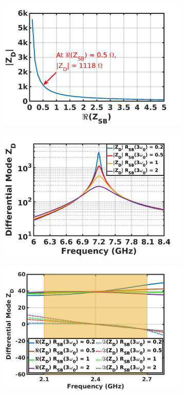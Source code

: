 \documentclass[conference]{IEEEtran}
\begin{document}
\begin{figure}[!t]
\captionsetup{font=footnotesize}
\centering
\begin{subfigure}{0.24\textwidth}
\includegraphics[width=1\textwidth]{Images/Design/Design_A_Zn_3H.jpg}
\caption{}
\label{fig:Design_A_Zn_3H}
\end{subfigure}
\begin{subfigure}{0.24\textwidth}
\includegraphics[width=1\textwidth]{Images/Design/Design_A_Rn_var_3H.jpg}
\caption{}
\label{fig:Design_A_Rn_var_3H}
\end{subfigure}
\begin{subfigure}{0.4\textwidth}
\includegraphics[width=1\textwidth]{Images/Design/Design_A_Rn_var_1H.jpg}

\end{subfigure}
\end{figure}
\end{document}
